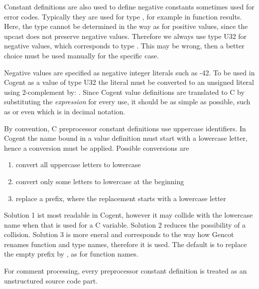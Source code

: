 Constant definitions are also used to define negative constants sometimes used for error codes. Typically they are used for 
type , for example in function results. Here, the type cannot be determined in the way as for positive values, since the 
upcast does not preserve negative values. Therefore we always use type U32 for negative values, which corresponds to type 
. This may be wrong, then a better choice must be used manually for the specific case.

Negative values are specified as negative integer literals such as -42. To be used in 
Cogent as a value of type U32 the literal must be converted to an unsigned literal using 2-complement by: 
.
Since Cogent value definitions are translated to C by substituting the \textit{expression} for every use, it should be as 
simple as possible, such as  or even  which is  in decimal notation.

By convention, C preprocessor constant definitions use uppercase identifiers. In Cogent the name bound in a value definition
must start with a lowercase letter, hence a conversion must be applied. Possible conversions are
\begin{enumerate}
\item convert all uppercase letters to lowercase
\item convert only some letters to lowercase at the beginning
\item replace a prefix, where the replacement starts with a lowercase letter
\end{enumerate}

Solution 1 ist most readable in Cogent, however it may collide with the lowercase name when that is used for a C variable. 
Solution 2 reduces the possibility of a collision. Solution 3 is more eneral and corresponds to the way how Gencot renames
function and type names, therefore it is used. The default is to replace the empty prefix by , as for
function names.

For comment processing, every preprocessor constant definition is treated as an unstructured source code part.

 
